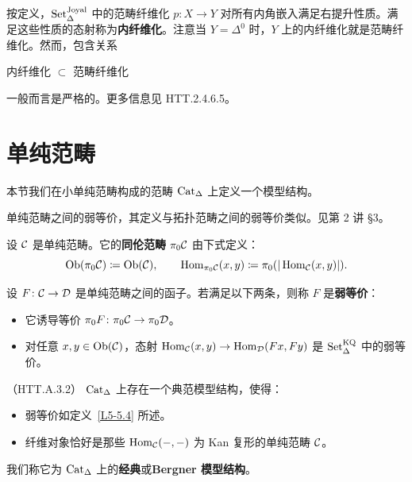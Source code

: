 \begin{remark}\label{L5-4.16}
按定义，$\operatorname{Set}^{\mathrm{Joyal}}_\Delta$ 中的范畴纤维化 $p\colon X\to Y$ 对所有内角嵌入满足右提升性质。满足这些性质的态射称为\textbf{内纤维化}。注意当 $Y=\Delta^0$ 时，$Y$ 上的内纤维化就是范畴纤维化。然而，包含关系
\begin{center}
内纤维化 $\subset$ 范畴纤维化
\end{center}
一般而言是严格的。更多信息见 HTT.2.4.6.5。
\end{remark}

\section{单纯范畴}

\nitem\label{L5-5.1} 本节我们在小单纯范畴构成的范畴 $\operatorname{Cat}_\Delta$ 上定义一个模型结构。

\nitem\label{L5-5.2} 单纯范畴之间的弱等价，其定义与拓扑范畴之间的弱等价类似。见第 2 讲 \S3。

\begin{definition}\label{L5-5.3}
设 $\mathcal{C}$ 是单纯范畴。它的\textbf{同伦范畴} $\pi_0\mathcal{C}$ 由下式定义：
\[
\operatorname{Ob}(\pi_0\mathcal{C})\coloneqq\operatorname{Ob}(\mathcal{C}),\qquad \operatorname{Hom}_{\pi_0\mathcal{C}}(x,y)\coloneqq\pi_0(|\operatorname{Hom}_{\mathcal{C}}(x,y)|).
\]
\end{definition}

\begin{definition}\label{L5-5.4}
设 $F\colon\mathcal{C}\to\mathcal{D}$ 是单纯范畴之间的函子。若满足以下两条，则称 $F$ 是\textbf{弱等价}：
\begin{itemize}[leftmargin=2.2em,itemsep=0.1em]
\item 它诱导等价 $\pi_0 F\colon\pi_0\mathcal{C}\to\pi_0\mathcal{D}$。
\item 对任意 $x,y\in\operatorname{Ob}(\mathcal{C})$，态射 $\operatorname{Hom}_{\mathcal{C}}(x,y)\to\operatorname{Hom}_{\mathcal{D}}(Fx,Fy)$ 是 $\operatorname{Set}^{\mathrm{KQ}}_\Delta$ 中的弱等价。
\end{itemize}
\end{definition}

\begin{theorem}\label{L5-5.5}（HTT.A.3.2）
$\operatorname{Cat}_\Delta$ 上存在一个典范模型结构，使得：
\begin{itemize}[leftmargin=2.2em,itemsep=0.1em]
\item 弱等价如定义~\ref{L5-5.4} 所述。
\item 纤维对象恰好是那些 $\operatorname{Hom}_{\mathcal{C}}(-,-)$ 为 Kan 复形的单纯范畴 $\mathcal{C}$。
\end{itemize}
我们称它为 $\operatorname{Cat}_\Delta$ 上的\textbf{经典}或\textbf{Bergner 模型结构}。
\end{theorem}

